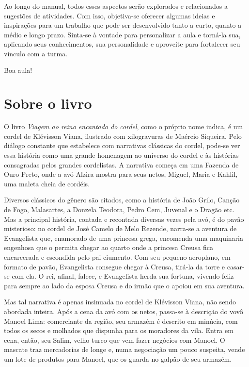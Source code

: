 \documentclass[11pt]{extarticle}
\begin{document}
Ao longo do manual, todos esses aspectos serão explorados e relacionados a sugestões de atividades. Com isso, objetiva-se oferecer algumas ideias e inspirações para um trabalho que pode ser desenvolvido tanto a curto, quanto a médio e longo prazo. Sinta-se à vontade para personalizar a aula e torná-la sua, aplicando seus conhecimentos, sua 
personalidade e aproveite para fortalecer seu vínculo com a turma.

Boa aula!


\section{Sobre o livro}
O livro \textit{Viagem ao reino encantado do cordel}, como o próprio nome indica, é um cordel de Klévisson Viana, ilustrado com xilogravuras de Maércio Siqueira. Pelo diálogo constante que estabelece com narrativas clássicas do cordel, pode-se ver essa história como uma grande homenagem ao universo do cordel e às histórias consagradas pelos grandes cordelistas. A narrativa começa em uma Fazenda de Ouro Preto, onde a avó Alzira mostra para seus netos, Miguel, Maria e Kahlil, uma maleta cheia de cordéis.

Diversos clássicos do gênero são citados, como a história de João Grilo, Canção de Fogo, Malasartes, a Donzela Teodora, Pedro Cem, Juvenal e o Dragão etc. Mas a principal história, contada e recontada diversas vezes pela avó, é do pavão misterioso: no cordel de José Camelo de Melo Rezende, narra-se a aventura de Evangelista que, enamorado de uma princesa grega, encomenda uma maquinaria engenhosa que o permita chegar ao quarto onde a princesa Creusa fica encarcerada e escondida pelo pai ciumento. Com seu pequeno aeroplano, em formato de pavão, Evangelista consegue chegar à Creusa, tirá-la da torre e casar-se com ela. O rei, afinal, falece, e Evangelista herda sua fortuna, vivendo feliz para sempre ao lado da esposa Creusa e do irmão que o apoiou em sua aventura.

Mas tal narrativa é apenas insinuada no cordel de Klévisson Viana, não sendo abordada inteira. Após a cena da avó com os netos, passa-se à descrição do vovô Manoel Lima: comerciante da região, seu armazém é descrito em minúcia, com todos os secos e molhados que dispunha para os moradores da vila. Entra em cena, então, seu Salim, velho turco que vem fazer negócios com Manoel. O mascate traz mercadorias de longe e, numa negociação um pouco suspeita, vende um lote de produtos para Manoel, que os guarda no galpão de seu armazém.
\end{document}

